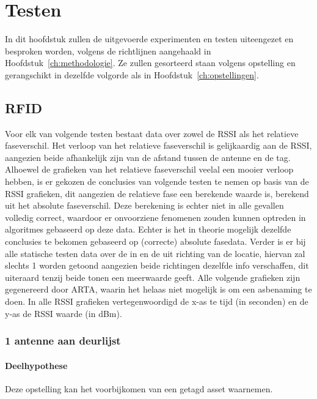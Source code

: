 
\chapter{Testen}
\label{ch:testen}

In dit hoofdstuk zullen de uitgevoerde experimenten en testen uiteengezet en besproken worden, volgens de richtlijnen aangehaald in Hoofdstuk~\ref{ch:methodologie}. Ze zullen gesorteerd staan volgens opstelling en gerangschikt in dezelfde volgorde als in Hoofdstuk~\ref{ch:opstellingen}.

\section{RFID}
Voor elk van volgende testen bestaat data over zowel de RSSI als het relatieve faseverschil. Het verloop van het relatieve faseverschil is gelijkaardig aan de RSSI, aangezien beide afhankelijk zijn van de afstand tussen de antenne en de tag. Alhoewel de grafieken van het relatieve faseverschil veelal een mooier verloop hebben, is er gekozen de conclusies van volgende testen te nemen op basis van de RSSI grafieken, dit aangezien de relatieve fase een berekende waarde is, berekend uit het absolute faseverschil. Deze berekening is echter niet in alle gevallen volledig correct, waardoor er onvoorziene fenomenen zouden kunnen optreden in algoritmes gebaseerd op deze data. Echter is het in theorie mogelijk dezelfde conclusies te bekomen gebaseerd op (correcte) absolute fasedata.
Verder is er bij alle statische testen data over de in en de uit richting van de locatie, hiervan zal slechts 1 worden getoond aangezien beide richtingen dezelfde info verschaffen, dit uiteraard tenzij beide tonen een meerwaarde geeft.
Alle volgende grafieken zijn gegenereerd door ARTA, waarin het helaas niet mogelijk is om een asbenaming te doen. In alle RSSI grafieken vertegenwoordigd de x-as te tijd (in seconden) en de y-as de RSSI waarde (in dBm).

\subsection{1 antenne aan deurlijst}
\subsubsection{Deelhypothese}
Deze opstelling kan het voorbijkomen van een getagd asset waarnemen.

